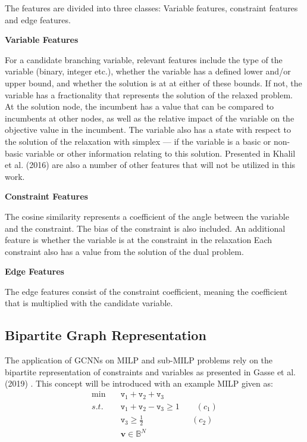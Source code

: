The features are divided into three classes: Variable features, constraint features and edge features.


\textbf{Variable Features}

For a candidate branching variable, relevant features include the type of the variable (binary, integer etc.), whether the variable has a defined lower and/or upper bound, and whether the solution is at at either of these bounds.  
If not, the variable has a fractionality that represents the solution of the relaxed problem.
At the solution node, the incumbent has a value that can be compared to incumbents at other nodes, as well as the relative impact of the variable on the objective value in the incumbent. 
The variable also has a state with respect to the solution of the relaxation with simplex --- if the variable is a basic or non-basic variable or other information relating to this solution.
Presented in Khalil et al. (2016) \cite{khalil2016learning} are also a number of other features that will not be utilized in this work.




\textbf{Constraint Features}

The cosine similarity represents a coefficient of the angle between the variable and the constraint.   
The bias of the constraint is also included. 
An additional feature is whether the variable is at the constraint in the relaxation
Each constraint also has a value from the solution of the dual problem. 


\textbf{Edge Features}

The edge features consist of the constraint coefficient, meaning the coefficient that is multiplied with the candidate variable.




\subsection{Bipartite Graph Representation}

The application of \gls{GCNN}s on \gls{MILP} and sub-\gls{MILP} problems rely on the bipartite representation of constraints and variables as presented in Gasse et al. (2019) \cite{gasse2019exact}.
This concept will be introduced with an example \gls{MILP} given as:
\begin{align}\label{eq:bipex}
    \min \quad &\texttt{v}_1 + \texttt{v}_2 + \texttt{v}_3\\ 
    s.t. \quad &\texttt{v}_1 + \texttt{v}_2 - \texttt{v}_3 \geq 1 \qquad (c_1)\nonumber\\
    &\texttt{v}_3 \geq \frac{1}{2}\qquad\qquad\quad\;\,\,\, (c_2)\nonumber\\
    &\mathbf{v} \in \mathbb{B}^N \nonumber
\end{align}

